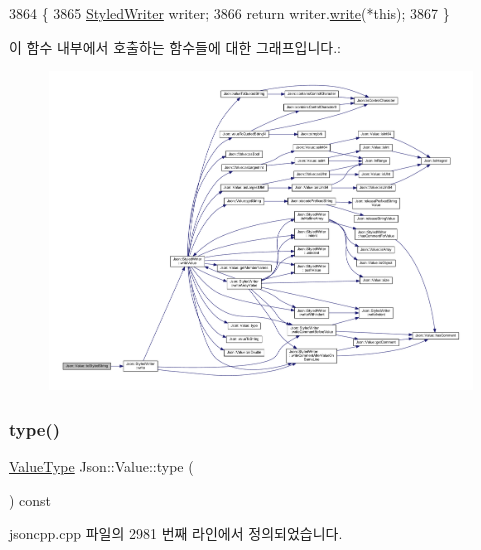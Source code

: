 \begin{DoxyCode}
3864                                            \{
3865   \hyperlink{class_json_1_1_styled_writer}{StyledWriter} writer;
3866   \textcolor{keywordflow}{return} writer.\hyperlink{class_json_1_1_styled_writer_a5efab19b9746da9920c29cdae3a6b404}{write}(*\textcolor{keyword}{this});
3867 \}
\end{DoxyCode}
이 함수 내부에서 호출하는 함수들에 대한 그래프입니다.\+:
\nopagebreak
\begin{figure}[H]
\begin{center}
\leavevmode
\includegraphics[width=350pt]{class_json_1_1_value_a00154cc8662d7a845ed59e175c2496cb_cgraph}
\end{center}
\end{figure}
\mbox{\label{class_json_1_1_value_a8ce61157a011894f0252ceed232312de}} 
\subsubsection{\texorpdfstring{type()}{type()}}
{\footnotesize\ttfamily \hyperlink{namespace_json_a7d654b75c16a57007925868e38212b4e}{Value\+Type} Json\+::\+Value\+::type (\begin{DoxyParamCaption}{ }\end{DoxyParamCaption}) const}



jsoncpp.\+cpp 파일의 2981 번째 라인에서 정의되었습니다.


